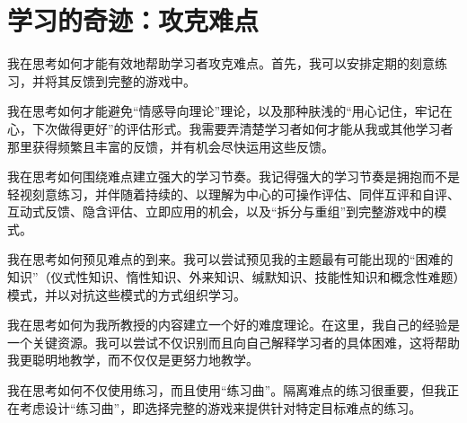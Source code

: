\section*{学习的奇迹：攻克难点}

我在思考如何才能有效地帮助学习者攻克难点。首先，我可以安排定期的刻意练习，并将其反馈到完整的游戏中。

我在思考如何才能避免“情感导向理论”理论，以及那种肤浅的“用心记住，牢记在心，下次做得更好”的评估形式。我需要弄清楚学习者如何才能从我或其他学习者那里获得频繁且丰富的反馈，并有机会尽快运用这些反馈。

我在思考如何围绕难点建立强大的学习节奏。我记得强大的学习节奏是拥抱而不是轻视刻意练习，并伴随着持续的、以理解为中心的可操作评估、同伴互评和自评、互动式反馈、隐含评估、立即应用的机会，以及“拆分与重组”到完整游戏中的模式。

我在思考如何预见难点的到来。我可以尝试预见我的主题最有可能出现的“困难的知识”（仪式性知识、惰性知识、外来知识、缄默知识、技能性知识和概念性难题）模式，并以对抗这些模式的方式组织学习。

我在思考如何为我所教授的内容建立一个好的难度理论。在这里，我自己的经验是一个关键资源。我可以尝试不仅识别而且向自己解释学习者的具体困难，这将帮助我更聪明地教学，而不仅仅是更努力地教学。

我在思考如何不仅使用练习，而且使用“练习曲”。隔离难点的练习很重要，但我正在考虑设计“练习曲”，即选择完整的游戏来提供针对特定目标难点的练习。